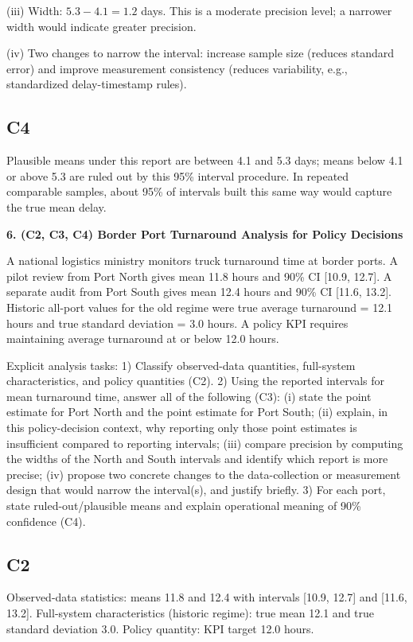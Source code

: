 \begin{ExamProblems}
		(iii) Width: $5.3-4.1=1.2$ days. This is a moderate precision level; a narrower width would indicate greater precision.
		
		(iv) Two changes to narrow the interval: increase sample size (reduces standard error) and improve measurement consistency (reduces variability, e.g., standardized delay-timestamp rules).
		
		\subsection*{C4}
		Plausible means under this report are between 4.1 and 5.3 days; means below 4.1 or above 5.3 are ruled out by this 95\% interval procedure.
		In repeated comparable samples, about 95\% of intervals built this same way would capture the true mean delay.
		
		\newpage
		\item
		\textbf{6. (C2, C3, C4) Border Port Turnaround Analysis for Policy Decisions}
		
		A national logistics ministry monitors truck turnaround time at border ports.
		A pilot review from Port North gives mean 11.8 hours and 90\% CI [10.9, 12.7].
		A separate audit from Port South gives mean 12.4 hours and 90\% CI [11.6, 13.2].
		Historic all-port values for the old regime were true average turnaround = 12.1 hours and true standard deviation = 3.0 hours.
		A policy KPI requires maintaining average turnaround at or below 12.0 hours.
		
		Explicit analysis tasks:
		1) Classify observed-data quantities, full-system characteristics, and policy quantities (C2).
		2) Using the reported intervals for mean turnaround time, answer all of the following (C3): (i) state the point estimate for Port North and the point estimate for Port South; (ii) explain, in this policy-decision context, why reporting only those point estimates is insufficient compared to reporting intervals; (iii) compare precision by computing the widths of the North and South intervals and identify which report is more precise; (iv) propose two concrete changes to the data-collection or measurement design that would narrow the interval(s), and justify briefly.
		3) For each port, state ruled-out/plausible means and explain operational meaning of 90\% confidence (C4).
		
		\subsection*{C2}
		Observed-data statistics: means 11.8 and 12.4 with intervals [10.9, 12.7] and [11.6, 13.2].
		Full-system characteristics (historic regime): true mean 12.1 and true standard deviation 3.0.
		Policy quantity: KPI target 12.0 hours.
		

\end{ExamProblems}
